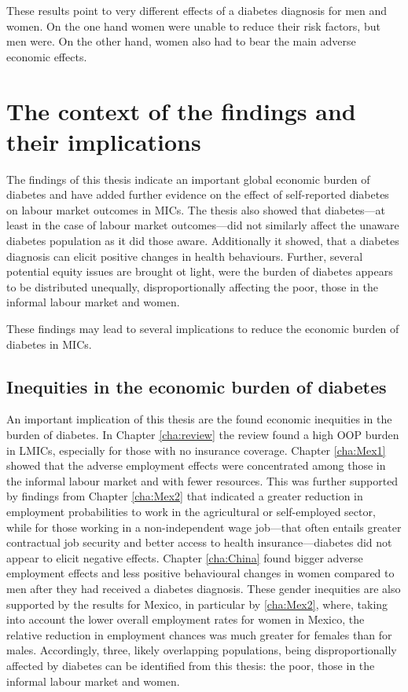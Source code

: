 These results point to very different effects of a diabetes diagnosis for men and women. On the one hand women were unable to reduce their risk factors, but men were. On the other hand, women also had to bear the main adverse economic effects. 

\section{The context of the findings and their implications}

The findings of this thesis indicate an important global economic burden of diabetes and have added further evidence on the effect of self-reported diabetes on labour market outcomes in \acp{MIC}. The thesis also showed that diabetes---at least in the case of labour market outcomes---did not similarly affect the unaware diabetes population as it did those aware. Additionally it showed, that a diabetes diagnosis can elicit positive changes in health behaviours. Further, several potential equity issues are brought ot light, were the burden of diabetes appears to be distributed unequally, disproportionally affecting the poor, those in the informal labour market and women.

These findings may lead to several implications to reduce the economic burden of diabetes in \acp{MIC}. 

\subsection*{Inequities in the economic burden of diabetes}

An important implication of this thesis are the found economic inequities in the burden of diabetes. In Chapter \ref{cha:review} the review found a high \ac{OOP} burden in \acp{LMIC}, especially for those with no insurance coverage. Chapter \ref{cha:Mex1} showed that the adverse employment effects were concentrated among those in the informal labour market and with fewer resources. This was further supported by findings from Chapter \ref{cha:Mex2} that indicated a greater reduction in employment probabilities to work in the agricultural or self-employed sector, while for those working in a non-independent wage job---that often entails greater contractual job security and better access to health insurance---diabetes did not appear to elicit negative effects. Chapter \ref{cha:China} found bigger adverse employment effects and less positive behavioural changes in women compared to men after they had received a diabetes diagnosis. These gender inequities are also supported by the results for Mexico, in particular by \ref{cha:Mex2}, where, taking into account the lower overall employment rates for women in Mexico, the relative reduction in employment chances was much greater for females than for males. Accordingly, three, likely overlapping populations, being disproportionally affected by diabetes can be identified from this thesis: the poor, those in the informal labour market and women.

